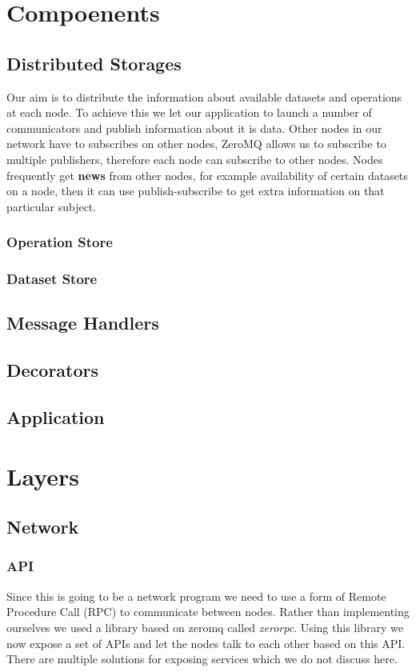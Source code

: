 \section{Compoenents}
\subsection{Distributed Storages}
Our aim is to distribute the information about available datasets and operations at each node. To achieve this
we let our application to launch a number of communicators and publish information about it is data.
Other nodes in our network have to subscribes on other nodes, ZeroMQ allows us to subscribe
to multiple publishers, therefore each node can subscribe to other nodes. Nodes frequently get
\textbf{news} from other nodes, for example availability of certain datasets on a node, then it
can use publish-subscribe to get extra information on that particular subject.
\subsubsection{Operation Store}
\subsubsection{Dataset Store}
\subsection{Message Handlers}
\subsection{Decorators}
\subsection{Application}

\section{Layers}
\subsection{Network}
\subsubsection{API}
Since this is going to be a network program we need to use a form of Remote Procedure Call (RPC) 
to communicate between nodes. Rather than implementing ourselves we used a library based on zeromq 
called \textit{zerorpc}. Using this library we now expose a set of APIs and let the nodes talk to 
each other based on this API. There are multiple solutions for exposing services which we do not discuss here.
